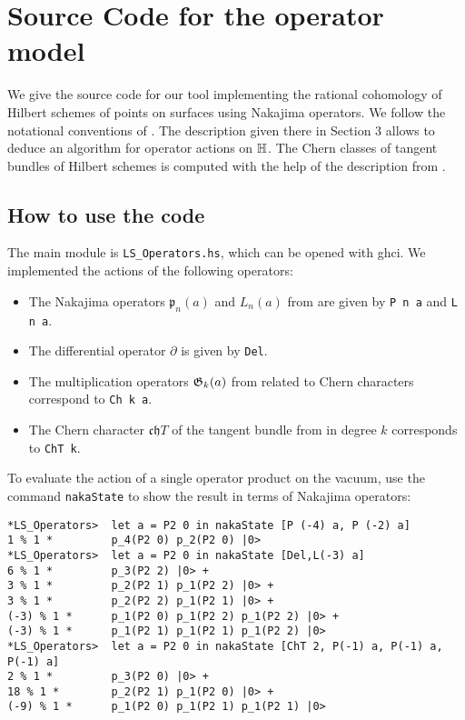 
\section{Source Code for the operator model}
We give the source code for our tool implementing the rational cohomology of Hilbert schemes of points on surfaces using Nakajima operators. 
We follow the notational conventions of \cite{LehnSorger}. The description given there in Section 3 allows to deduce an algorithm for operator actions on $\mathbb{H}$. The Chern classes of  tangent bundles of Hilbert schemes is computed with the help of the description from \cite[Section 3]{Boissiere}.

\subsection{How to use the code}
The main module is \verb|LS_Operators.hs|, which can be opened with ghci.
We implemented the actions of the following operators:
\begin{itemize}
 \item The Nakajima operators $\mathfrak p_n(a)$ and $L_n(a)$ from \cite{LehnSorger} are given by \verb|P n a| and \verb|L n a|. 
 \item The differential operator $\partial$ is given by \verb|Del|.
 \item The multiplication operators $\mathfrak{G}_k(a)$ from \cite{LiQinWang} related to Chern characters correspond to \verb|Ch k a|.
 \item The Chern character $\mathfrak{ch}T$ of the tangent bundle from \cite{Boissiere} in degree $k$ corresponds to \verb|ChT k|.
\end{itemize}
\begin{example}
To evaluate the action of a single operator product on the vacuum, use the command \verb|nakaState| to show the result in terms of Nakajima operators:
\begin{verbatim}
*LS_Operators>  let a = P2 0 in nakaState [P (-4) a, P (-2) a]
1 % 1 *         p_4(P2 0) p_2(P2 0) |0>
*LS_Operators>  let a = P2 0 in nakaState [Del,L(-3) a]
6 % 1 *         p_3(P2 2) |0> +
3 % 1 *         p_2(P2 1) p_1(P2 2) |0> +
3 % 1 *         p_2(P2 2) p_1(P2 1) |0> +
(-3) % 1 *      p_1(P2 0) p_1(P2 2) p_1(P2 2) |0> +
(-3) % 1 *      p_1(P2 1) p_1(P2 1) p_1(P2 2) |0>
*LS_Operators>  let a = P2 0 in nakaState [ChT 2, P(-1) a, P(-1) a, P(-1) a]
2 % 1 *         p_3(P2 0) |0> +
18 % 1 *        p_2(P2 1) p_1(P2 0) |0> +
(-9) % 1 *      p_1(P2 0) p_1(P2 1) p_1(P2 1) |0>
\end{verbatim}
\end{example}

